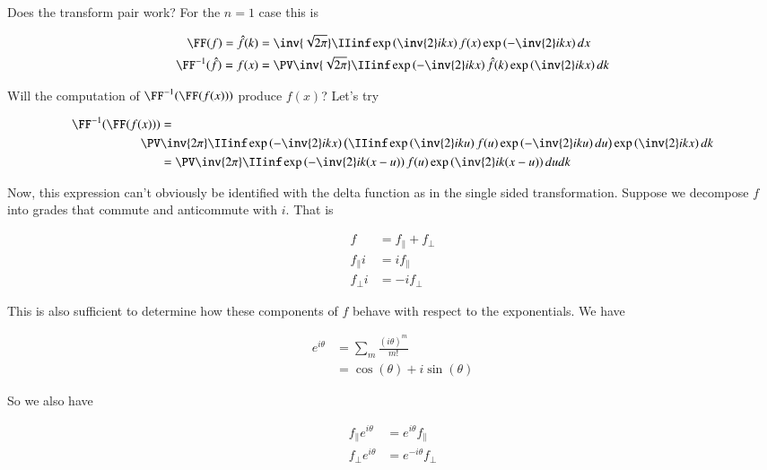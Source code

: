 Does the transform pair work?  For the $n=1$ case this is

\begin{align*}
\FF(f) = \hat{f}(k) &= \inv{\sqrt{2\pi}} \IIinf \exp\left( \inv{2} i k x \right) f(x) \exp\left( - \inv{2} i k x \right) dx \\
\FF^{-1}(\hat{f}) = {f}(x) &= \PV \inv{\sqrt{2\pi}} \IIinf \exp\left( -\inv{2} i k x \right) \hat{f}(k) \exp\left( \inv{2} i k x \right) dk
\end{align*}

Will the computation of $\FF^{-1}(\FF(f(x)))$ produce $f(x)$?  Let's try

\begin{align*}
\FF^{-1}(\FF(f(x)))
&= \\
\PV &\inv{{2\pi}} \IIinf \exp\left( -\inv{2} i k x \right) 
\left(
\IIinf \exp\left( \inv{2} i k u \right) f(u) \exp\left( - \inv{2} i k u \right) du 
\right)
\exp\left( \inv{2} i k x \right) dk \\
&=
\PV \inv{{2\pi}} \IIinf \exp\left( -\inv{2} i k (x -u) \right) f(u) \exp\left( \inv{2} i k (x -u) \right) du dk \\
\end{align*}

Now, this expression can't obviously be identified with the delta function as in the single sided transformation.  Suppose we decompose $f$ into grades that 
commute and anticommute with $i$.  That is

\begin{align*}
f &= f_\parallel + f_\perp \\
f_\parallel i &= i f_\parallel  \\
f_\perp  i &= -i f_\perp 
\end{align*}

This is also sufficient to determine how these components of $f$ behave with respect to the exponentials.  We have

\begin{align*}
e^{i\theta} 
&= \sum_m \frac{(i\theta)^m}{m!} \\
&= \cos(\theta) + i\sin(\theta)
\end{align*}

So we also have

\begin{align*}
f_\parallel e^{i\theta} &= e^{i\theta} f_\parallel  \\
f_\perp e^{i\theta} &= e^{-i\theta} f_\perp 
\end{align*}

